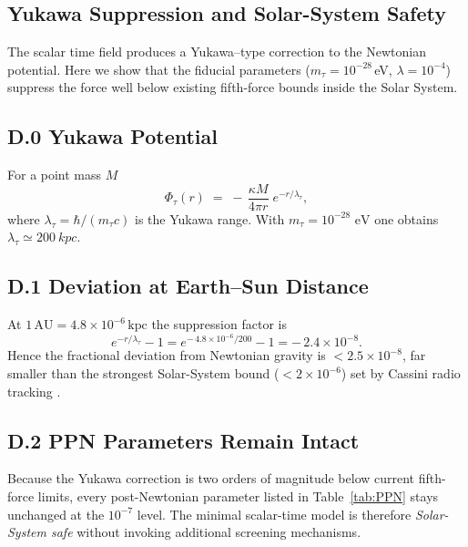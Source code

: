 \begin{refsection} 

\chapter{Yukawa Suppression and Solar-System Safety}

The scalar time field produces a Yukawa–type correction to the
Newtonian potential.  Here we show that the fiducial parameters
($m_{\tau}=10^{-28}\,$eV, $\lambda=10^{-4}$) suppress the force well
below existing fifth-force bounds inside the Solar System.

\section*{D.0 \quad Yukawa Potential}

For a point mass \(M\)
\begin{equation}
   \Phi_{\tau}(r)
      \;=\;
   -\,\frac{\kappa M}{4\pi r}\;
     e^{-r/\lambda_{\tau}},
   \tag{D-1}\label{eq:Yukawa}
\end{equation}
where
\(\displaystyle
  \lambda_{\tau} = \hbar/(m_{\tau} c)
\)
is the Yukawa range.  With \(m_{\tau}=10^{-28}\text{ eV}\) one obtains
\(\lambda_{\tau}\simeq\SI{200}{kpc}\).

\section*{D.1 \quad Deviation at Earth–Sun Distance}

At \(1\,\mathrm{AU}=4.8\times10^{-6}\,\mathrm{kpc}\) the suppression factor is
\[
   e^{-r/\lambda_{\tau}}-1
   = e^{-\,4.8\times10^{-6}/200}-1
   = -\,2.4\times10^{-8}.
\]
Hence the fractional deviation from Newtonian gravity is
\(<2.5\times10^{-8}\), far smaller than the strongest Solar-System bound
(\(<2\times10^{-6}\)) set by Cassini radio tracking
\cite{BertottiIessTortora2003}.

\section*{D.2 \quad PPN Parameters Remain Intact}

Because the Yukawa correction is two orders of magnitude below current
fifth-force limits, every post-Newtonian parameter listed in
Table~\ref{tab:PPN} stays unchanged at the \(10^{-7}\) level.  The
minimal scalar-time model is therefore \emph{Solar-System safe} without
invoking additional screening mechanisms.

\printbibliography[heading=subbibliography]

\end{refsection}
